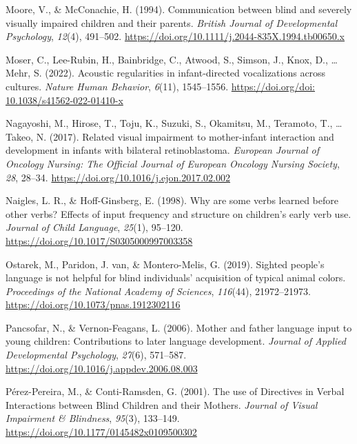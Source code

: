 \documentclass[
  man]{apa6}
\newlength{\cslhangindent}
\newlength{\cslentryspacingunit} %
\newenvironment{CSLReferences}[2] %
 {%
  \setlength{\parindent}{0pt}
  \ifodd #1
  \let\oldpar\par
  \def\par{\hangindent=\cslhangindent\oldpar}
  \fi
  \setlength{\parskip}{#2\cslentryspacingunit}
 }%
 {}
\begin{document}
\begin{CSLReferences}{1}{0}
\leavevmode{}%
Moore, V., \& McConachie, H. (1994). Communication between blind and severely visually impaired children and their parents. \emph{British Journal of Developmental Psychology}, \emph{12}(4), 491--502. \url{https://doi.org/10.1111/j.2044-835X.1994.tb00650.x}

\leavevmode{}%
Moser, C., Lee-Rubin, H., Bainbridge, C., Atwood, S., Simson, J., Knox, D., \ldots{} Mehr, S. (2022). Acoustic regularities in infant-directed vocalizations across cultures. \emph{Nature Human Behavior}, \emph{6}(11), 1545--1556. \href{https://doi.org/doi:\%2010.1038/s41562-022-01410-x}{https://doi.org/doi: 10.1038/s41562-022-01410-x}

\leavevmode{}%
Nagayoshi, M., Hirose, T., Toju, K., Suzuki, S., Okamitsu, M., Teramoto, T., \ldots{} Takeo, N. (2017). Related visual impairment to mother-infant interaction and development in infants with bilateral retinoblastoma. \emph{European Journal of Oncology Nursing: The Official Journal of European Oncology Nursing Society}, \emph{28}, 28--34. \url{https://doi.org/10.1016/j.ejon.2017.02.002}

\leavevmode{}%
Naigles, L. R., \& Hoff-Ginsberg, E. (1998). Why are some verbs learned before other verbs? {Effects} of input frequency and structure on children's early verb use. \emph{Journal of Child Language}, \emph{25}(1), 95--120. \url{https://doi.org/10.1017/S0305000997003358}

\leavevmode{}%
Ostarek, M., Paridon, J. van, \& Montero-Melis, G. (2019). Sighted people's language is not helpful for blind individuals' acquisition of typical animal colors. \emph{Proceedings of the National Academy of Sciences}, \emph{116}(44), 21972--21973. \url{https://doi.org/10.1073/pnas.1912302116}

\leavevmode{}%
Pancsofar, N., \& Vernon-Feagans, L. (2006). Mother and father language input to young children: {Contributions} to later language development. \emph{Journal of Applied Developmental Psychology}, \emph{27}(6), 571--587. \url{https://doi.org/10.1016/j.appdev.2006.08.003}

\leavevmode{}%
Pérez-Pereira, M., \& Conti-Ramsden, G. (2001). The use of {Directives} in {Verbal Interactions} between {Blind Children} and their {Mothers}. \emph{Journal of Visual Impairment \& Blindness}, \emph{95}(3), 133--149. \url{https://doi.org/10.1177/0145482x0109500302}


\end{CSLReferences}
\end{document}
